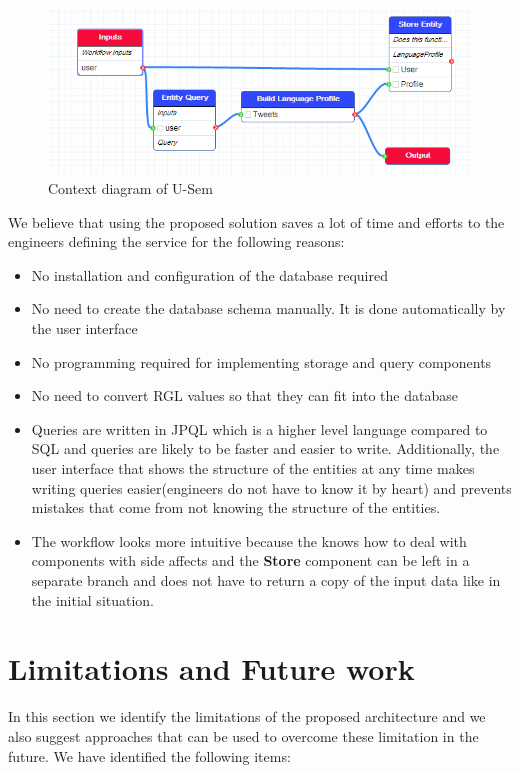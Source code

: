 \documentclass[a4paper, notitlepage]{article}
\begin{document}
\begin{figure}[h!]
  \centering
  	\includegraphics[scale=0.5]{eval/after.png}
  \caption{Context diagram of U-Sem }
  \label{fig_context}
\end{figure}

We believe that using the proposed solution saves a lot of time and efforts to the engineers defining the service for the following reasons:

\begin{itemize}
	\item No installation and configuration of the database required
	\item No need to create the database schema manually. It is done automatically by the user interface
	\item No programming required for implementing storage and query components
	\item No need to convert RGL values so that they can fit into the database
	\item Queries are written in JPQL which is a higher level language compared to SQL and queries are likely to be faster and easier to write. Additionally, the user interface that shows the structure of the entities at any time makes writing queries easier(engineers do not have to know it by heart) and prevents mistakes that come from not knowing the structure of the entities. 
	\item The workflow looks more intuitive because the knows how to deal with components with side affects and the \textbf{Store} component can be left in a separate branch and does not have to return a copy of the input data like in the initial situation.
\end{itemize}


\section{Limitations and Future work}

In this section we identify the limitations of the proposed architecture and we also suggest approaches that can be used to overcome these limitation in the future. We have identified the following items:
\end{document}
